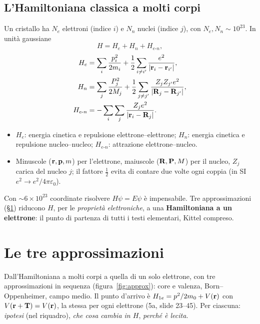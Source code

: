 \documentclass[11pt,a4paper]{article}
\begin{document}
\subsection{L'Hamiltoniana classica a molti corpi}
\begin{definizione}
Un cristallo ha $N_e$ elettroni (indice $i$) e $N_n$ nuclei (indice $j$), con $N_e,N_n\sim10^{23}$. In unità gaussiane
\[
H=H_e+H_n+H_{e\text{-}n},
\]
\begin{align*}
H_e&=\sum_i\frac{p_i^2}{2m_i}+\frac12\sum_{i\ne i'}\frac{e^2}{|\mathbf r_i-\mathbf r_{i'}|},\\
H_n&=\sum_j\frac{P_j^2}{2M_j}+\frac12\sum_{j\ne j'}\frac{Z_jZ_{j'}e^2}{|\mathbf R_j-\mathbf R_{j'}|},\\
H_{e\text{-}n}&=-\sum_i\sum_j\frac{Z_je^2}{|\mathbf r_i-\mathbf R_j|}.
\end{align*}
\end{definizione}
\begin{itemize}[leftmargin=*]
\item $H_e$: energia cinetica e repulsione elettrone--elettrone; $H_n$: energia cinetica e repulsione nucleo--nucleo; $H_{e\text{-}n}$: attrazione elettrone--nucleo.
\item Minuscole ($\mathbf r,\mathbf p,m$) per l'elettrone, maiuscole ($\mathbf R,\mathbf P,M$) per il nucleo, $Z_j$ carica del nucleo $j$; il fattore $\frac12$ evita di
contare due volte ogni coppia (in SI $e^2\to e^2/4\pi\varepsilon_0$).
\end{itemize}

Con $\sim6\times10^{23}$ coordinate risolvere $H\psi=E\psi$ è impensabile. Tre approssimazioni (§\ref{sec:approx}) riducono $H$, per le
\emph{proprietà elettroniche}, a una \textbf{Hamiltoniana a un elettrone}: il punto di partenza di tutti i testi elementari, Kittel compreso.

\section{Le tre approssimazioni}\label{sec:approx}
Dall'Hamiltoniana a molti corpi a quella di un solo elettrone, con tre approssimazioni in sequenza (figura~\ref{fig:approx}): core e valenza,
Born--Oppenheimer, campo medio. Il punto d'arrivo è $H_{1e}=p^2/2m_0+V(\mathbf r)$ con $V(\mathbf r+\mathbf T)=V(\mathbf r)$, la stessa per ogni elettrone (5a, slide 23--45).
Per ciascuna: \emph{ipotesi} (nel riquadro), \emph{che cosa cambia in $H$}, \emph{perché è lecita}.
\end{document}
